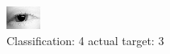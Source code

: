 \begin{figure}[h!]
\begin{center}
\includegraphics[width=0.60\columnwidth]{figures/ID43_class_4_target_3.png}
\end{center}
\caption{ Classification: 4 actual target: 3}
\label{fig:ID43_class_4_target_3}
\end{figure}
